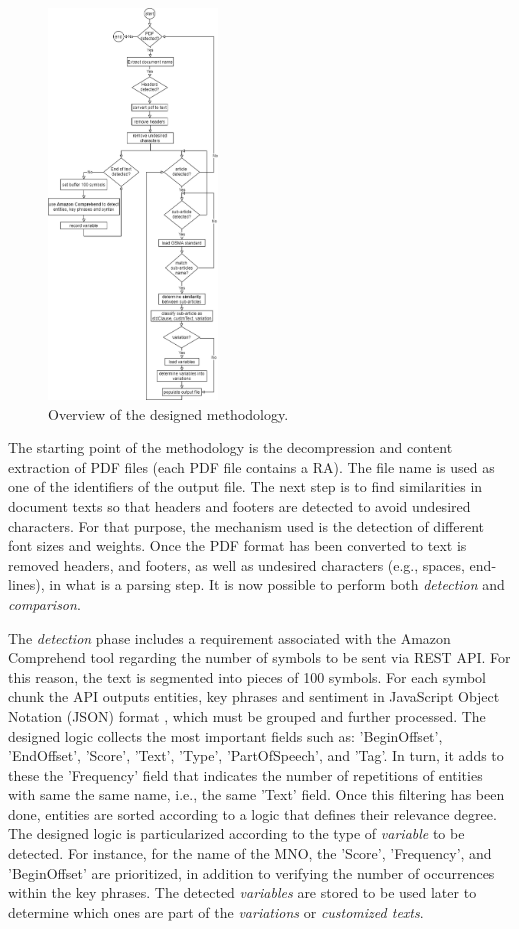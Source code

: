 \begin{figure}[htbp]
\centerline{\includegraphics[width=0.4\textwidth]{images/methodology.png}}
\caption{Overview of the designed methodology.}
\label{fig1}
\end{figure}

The starting point of the methodology is the decompression and content extraction of PDF files (each PDF file contains a RA). The file name is used as one of the identifiers of the output file. The next step is to find similarities in document texts so that headers and footers are detected to avoid undesired characters. For that purpose, the mechanism used is the detection of different font sizes and weights. Once the PDF format has been converted to text is removed headers, and footers, as well as undesired characters (e.g., spaces, end-lines), in what is a parsing step. It is now possible to perform both \textit{detection} and \textit{comparison}.

The \textit{detection} phase includes a requirement associated with the Amazon Comprehend tool regarding the number of symbols to be sent via REST API. For this reason, the text is segmented into pieces of 100 symbols. For each symbol chunk the API outputs entities, key phrases and sentiment in JavaScript Object Notation (JSON) format \cite{AWS2021}, which must be grouped and further processed. The designed logic collects the most important fields such as: 'BeginOffset', 'EndOffset', 'Score', 'Text', 'Type', 'PartOfSpeech', and 'Tag'. In turn, it adds to these the 'Frequency' field that indicates the number of repetitions of entities with same the same name, i.e., the same 'Text' field. Once this filtering has been done, entities are sorted according to a logic that defines their relevance degree. The designed logic is particularized according to the type of \textit{variable} to be detected. For instance, for the name of the MNO, the 'Score', 'Frequency', and 'BeginOffset' are prioritized, in addition to verifying the number of occurrences within the key phrases. The detected \textit{variables} are stored to be used later to determine which ones are part of the \textit{variations} or \textit{customized texts}.

